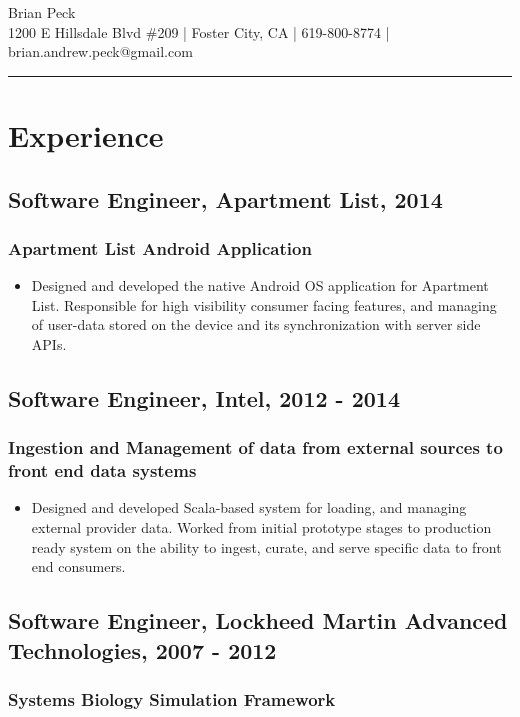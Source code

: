 \documentclass[11pt]{article}
\title{}
\date{}
\begin{document}
\begin{center}
{\huge Brian Peck} \\
1200 E Hillsdale Blvd \#209 | Foster City, CA | 619-800-8774 | brian.andrew.peck@gmail.com
\hrule
\end{center}

\section*{Experience}
\label{sec-1}
\subsection*{Software Engineer, Apartment List, 2014}
\label{sec-1-1}
\subsubsection*{Apartment List Android Application}
\label{sec-1-1-1}

\begin{itemize}
\item Designed and developed the native Android OS application for Apartment List. Responsible for high visibility consumer facing features, and managing of user-data stored on the device and its synchronization with server side APIs.
\end{itemize}
\subsection*{Software Engineer, Intel, 2012 - 2014}
\label{sec-1-2}
\subsubsection*{Ingestion and Management of data from external sources to front end data systems}
\label{sec-1-2-1}

\begin{itemize}
\item Designed and developed Scala-based system for loading, and managing external provider data. Worked from initial prototype stages to production ready system on the ability to ingest, curate, and serve specific data to front end consumers.
\end{itemize}
\subsection*{Software Engineer, Lockheed Martin Advanced Technologies, 2007 - 2012}
\label{sec-1-3}
\subsubsection*{Systems Biology Simulation Framework}
\label{sec-1-3-1}
\end{document}
